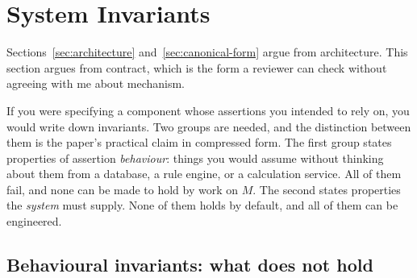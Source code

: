 \section{System Invariants}
\label{sec:invariants}

Sections~\ref{sec:architecture} and~\ref{sec:canonical-form} argue from
architecture. This section argues from contract, which is the form a reviewer can
check without agreeing with me about mechanism.

If you were specifying a component whose assertions you intended to rely on, you
would write down invariants. Two groups are needed, and the distinction between
them is the paper's practical claim in compressed form. The first group states
properties of assertion \emph{behaviour}: things you would assume without thinking
about them from a database, a rule engine, or a calculation service. All of them
fail, and none can be made to hold by work on $M$. The second states properties the
\emph{system} must supply. None of them holds by default, and all of them can be
engineered.

\subsection{Behavioural invariants: what does not hold}

